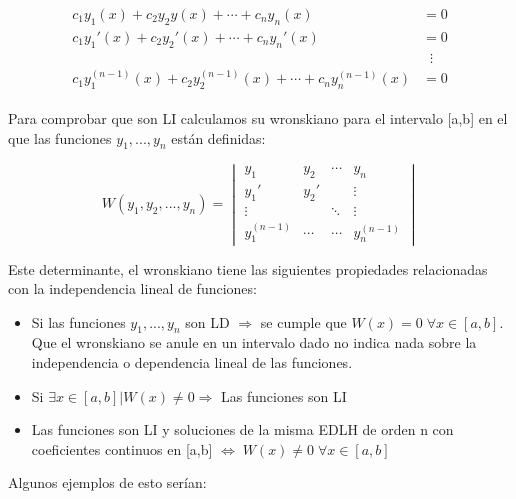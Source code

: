 \documentclass[a4paper,12pt,titlepage]{article}
\begin{document}
\begin{align}
    \begin{split}
        c_1y_1(x) + c_2y_2y(x) + \cdots + c_n y_n(x) &= 0
        \\
        c_1y_1'(x) + c_2y_2'(x) + \cdots + c_n y_n'(x) &= 0
        \\  
        & \;\;\vdots
        \\
        c_1y_1^{(n-1)}(x) + c_2y_2^{(n-1)}(x) + \cdots + c_n y_n^{(n-1)}(x) &= 0
    \end{split}
\end{align}

Para comprobar que son LI calculamos su wronskiano para el intervalo [a,b] en el que las funciones $y_1,...,y_n$ están definidas:

\begin{equation}
    W(y_1,y_2,...,y_n) = \begin{vmatrix}
        y_1 & y_2 & \cdots & y_n \\
        y_1' & y_2' &  & \vdots \\
        \vdots & & \ddots & \vdots \\
        y_1^{(n-1)} & \cdots & \cdots & y_n^{(n-1)}
    \end{vmatrix}
\end{equation}

Este determinante, el wronskiano tiene las siguientes propiedades relacionadas con la independencia lineal de funciones:

\begin{itemize}
    \item Si las funciones $y_1,...,y_n$ son LD $\Rightarrow$ se cumple que $W(x) = 0 \; \forall x \in [a,b]$. Que el wronskiano se anule en un intervalo dado no indica nada sobre la independencia o dependencia lineal de las funciones.
    \item Si $\exists x \in [a,b] \vert W(x) \neq 0 \Rightarrow$ Las funciones son LI
    \item Las funciones son LI y soluciones de la misma EDLH de orden n con coeficientes continuos en [a,b] $\Longleftrightarrow \; W(x) \neq 0 \; \forall x \in [a,b]$ 
\end{itemize}

Algunos ejemplos de esto serían:
\end{document}
